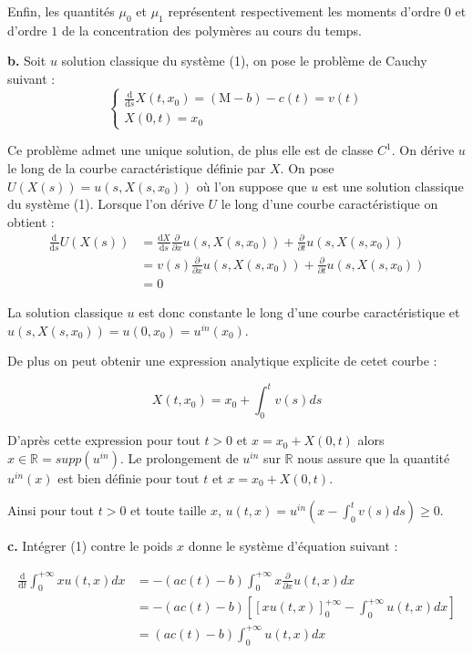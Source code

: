 \documentclass[a4paper]{article}
\newcommand{\mass}{\mathrm{M}}
\newcommand{\dep}{b}
\begin{document}
Enfin, les quantités $\mu_0$ et $\mu_1$ représentent respectivement les moments d'ordre $0$ et d'ordre $1$ de la concentration des polymères au cours du temps.

\textbf{b.}
Soit $u$ solution classique du système (1), 
on pose le problème de Cauchy suivant :
\begin{equation}
\begin{cases}
	\label{eq:caract}
	\displaystyle \frac{\mathrm{d}}{\mathrm{d}s} X(t,x_0)
	= (\mass - \dep) - c(t) 
	= v(t)\\
	X(0,t) = x_0
	\end{cases}
	\end{equation}
	
	Ce problème admet une unique solution, de plus elle est de classe $C^1$.
	On dérive $u$ le long de la courbe caractéristique définie par $X$.
	On pose $U(X(s))=u(s, X(s,x_0))$ où l'on suppose que $u$ est une solution classique du système (1).
	Lorsque l'on dérive $U$ le long d'une courbe caractéristique on obtient :
	\[ 
	\begin{split}
		\frac{\mathrm{d}}{\mathrm{d}s} U(X(s)) & = \frac{\mathrm{d} X }{\mathrm{d}s} \frac{\partial}{\partial x}u(s,X(s,x_0)) + \frac{\partial}{\partial t}u(s,X(s,x_0)) \\
		                                 & = v(s) \frac{\partial}{\partial x} u(s,X(s,x_0)) + \frac{\partial}{\partial t} u(s,X(s,x_0))\\
										 & =0 
	\end{split}
		\]
		
	La solution classique $u$ est donc constante le long d'une courbe caractéristique et $u(s,X(s,x_0)) = u(0,x_0)=u^{in}(x_0)$.
	
	De plus on peut obtenir une expression analytique explicite de cetet courbe :
	
	\[ X(t,x_0) = x_0 + \int_0^t v(s)ds \]
	
	D'après cette expression pour tout $t>0$ et $x = x_0 + X(0,t)$ 
	alors $x \in \mathbb{R} = supp(u^{in})$. 
	Le prolongement de $u^{in}$ sur $\mathbb{R}$ nous assure que la quantité
	$u^{in}(x)$ est bien définie pour tout $t$ et $x = x_0 + X(0,t)$.
	
	Ainsi pour tout $t>0$ et toute taille 
	$x$, $u(t,x) = u^{in}(x-\int_0^t v(s)ds)\geq 0$.

\textbf{c.}
Intégrer (1) contre le poids $x$ donne le système d'équation suivant :

\[	
\begin{split}
\displaystyle \frac{\mathrm{d}}{\mathrm{d} t} \int_0^{+\infty} x u(t,x)dx
	                        &= - (ac(t)-b)\int_0^{+\infty}
							x\frac{\partial}{\partial x}u(t,x)dx\\
							&= - (ac(t)-b) [
							[xu(t,x)]_0^{+\infty} 
							- \int_0^{+\infty} u(t,x)dx]\\
							& = (ac(t)-b) \int_0^{+\infty} u(t,x)dx
\end{split}
\]
\end{document}
